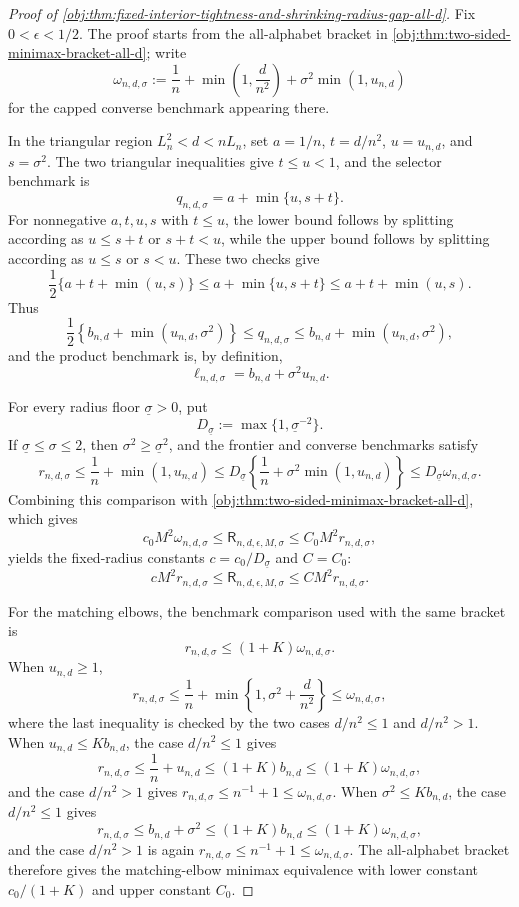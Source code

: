 \documentclass[11pt]{article}
\begin{document}
\begin{proof}[Proof of \cref{obj:thm:fixed-interior-tightness-and-shrinking-radius-gap-all-d}]
Fix \(0<\epsilon<1/2\).  The proof starts from the all-alphabet bracket in \cref{obj:thm:two-sided-minimax-bracket-all-d}; write
\[
\omega_{n,d,\sigma}
:=
\frac1n+\min\left(1,\frac d{n^2}\right)
+\sigma^2\min(1,u_{n,d})
\]
for the capped converse benchmark appearing there.

In the triangular region \(L_n^2<d<nL_n\), set \(a=1/n\), \(t=d/n^2\), \(u=u_{n,d}\), and \(s=\sigma^2\).  The two triangular inequalities give \(t\le u<1\), and the selector benchmark is
\[
q_{n,d,\sigma}=a+\min\{u,s+t\}.
\]
For nonnegative \(a,t,u,s\) with \(t\le u\), the lower bound follows by splitting according as \(u\le s+t\) or \(s+t<u\), while the upper bound follows by splitting according as \(u\le s\) or \(s<u\).  These two checks give
\[
\frac12\{a+t+\min(u,s)\}
\le a+\min\{u,s+t\}
\le a+t+\min(u,s).
\]
Thus
\[
\frac12\left\{b_{n,d}+\min(u_{n,d},\sigma^2)\right\}
\le q_{n,d,\sigma}
\le b_{n,d}+\min(u_{n,d},\sigma^2),
\]
and the product benchmark is, by definition,
\[
\ell_{n,d,\sigma}=b_{n,d}+\sigma^2u_{n,d}.
\]

For every radius floor \(\underline\sigma>0\), put
\[
D_{\underline\sigma}:=\max\{1,\underline\sigma^{-2}\}.
\]
If \(\underline\sigma\le\sigma\le2\), then \(\sigma^2\ge\underline\sigma^2\), and the frontier and converse benchmarks satisfy
\[
r_{n,d,\sigma}
\le \frac1n+\min(1,u_{n,d})
\le D_{\underline\sigma}
\left\{\frac1n+\sigma^2\min(1,u_{n,d})\right\}
\le D_{\underline\sigma}\omega_{n,d,\sigma}.
\]
Combining this comparison with \cref{obj:thm:two-sided-minimax-bracket-all-d}, which gives
\[
c_0M^2\omega_{n,d,\sigma}
\le \mathsf R_{n,d,\epsilon,M,\sigma}
\le C_0M^2r_{n,d,\sigma},
\]
yields the fixed-radius constants \(c=c_0/D_{\underline\sigma}\) and \(C=C_0\):
\[
cM^2r_{n,d,\sigma}
\le
\mathsf R_{n,d,\epsilon,M,\sigma}
\le
CM^2r_{n,d,\sigma}.
\]

For the matching elbows, the benchmark comparison used with the same bracket is
\[
r_{n,d,\sigma}\le (1+K)\omega_{n,d,\sigma}.
\]
When \(u_{n,d}\ge1\),
\[
r_{n,d,\sigma}\le \frac1n+\min\left\{1,\sigma^2+\frac d{n^2}\right\}\le \omega_{n,d,\sigma},
\]
where the last inequality is checked by the two cases \(d/n^2\le1\) and \(d/n^2>1\).  When \(u_{n,d}\le Kb_{n,d}\), the case \(d/n^2\le1\) gives
\[
r_{n,d,\sigma}\le \frac1n+u_{n,d}\le (1+K)b_{n,d}\le(1+K)\omega_{n,d,\sigma},
\]
and the case \(d/n^2>1\) gives \(r_{n,d,\sigma}\le n^{-1}+1\le\omega_{n,d,\sigma}\).  When \(\sigma^2\le Kb_{n,d}\), the case \(d/n^2\le1\) gives
\[
r_{n,d,\sigma}\le b_{n,d}+\sigma^2\le(1+K)b_{n,d}\le(1+K)\omega_{n,d,\sigma},
\]
and the case \(d/n^2>1\) is again \(r_{n,d,\sigma}\le n^{-1}+1\le\omega_{n,d,\sigma}\).  The all-alphabet bracket therefore gives the matching-elbow minimax equivalence with lower constant \(c_0/(1+K)\) and upper constant \(C_0\).


\end{proof}
\end{document}
